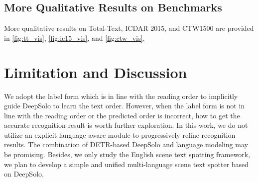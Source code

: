 \documentclass[10pt,twocolumn,letterpaper]{article}
\begin{document}
\subsection{More Qualitative Results on Benchmarks}
More qualitative results on Total-Text, ICDAR 2015, and CTW1500 are provided in \cref{fig:tt_vis}, \cref{fig:ic15_vis}, and \cref{fig:ctw_vis}.

\section{Limitation and Discussion}
\label{sec:limitation}
We adopt the label form which is in line with the reading order to implicitly guide DeepSolo to learn the text order. However, when the label form is not in line with the reading order or the predicted order is incorrect, how to get the accurate recognition result is worth further exploration. In this work, we do not utilize an explicit language-aware module to progressively refine recognition results. The combination of DETR-based DeepSolo and language modeling may be promising. Besides, we only study the English scene text spotting framework, we plan to develop a simple and unified multi-language scene text spotter based on DeepSolo.

{\small


}
\end{document}
